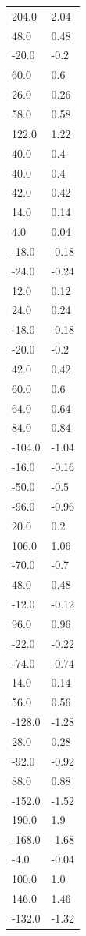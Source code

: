 \begin{longtable}{ll}
204.0 & 2.04 \\
48.0 & 0.48 \\
-20.0 & -0.2 \\
60.0 & 0.6 \\
26.0 & 0.26 \\
58.0 & 0.58 \\
122.0 & 1.22 \\
40.0 & 0.4 \\
40.0 & 0.4 \\
42.0 & 0.42 \\
14.0 & 0.14 \\
4.0 & 0.04 \\
-18.0 & -0.18 \\
-24.0 & -0.24 \\
12.0 & 0.12 \\
24.0 & 0.24 \\
-18.0 & -0.18 \\
-20.0 & -0.2 \\
42.0 & 0.42 \\
60.0 & 0.6 \\
64.0 & 0.64 \\
84.0 & 0.84 \\
-104.0 & -1.04 \\
-16.0 & -0.16 \\
-50.0 & -0.5 \\
-96.0 & -0.96 \\
20.0 & 0.2 \\
106.0 & 1.06 \\
-70.0 & -0.7 \\
48.0 & 0.48 \\
-12.0 & -0.12 \\
96.0 & 0.96 \\
-22.0 & -0.22 \\
-74.0 & -0.74 \\
14.0 & 0.14 \\
56.0 & 0.56 \\
-128.0 & -1.28 \\
28.0 & 0.28 \\
-92.0 & -0.92 \\
88.0 & 0.88 \\
-152.0 & -1.52 \\
190.0 & 1.9 \\
-168.0 & -1.68 \\
-4.0 & -0.04 \\
100.0 & 1.0 \\
146.0 & 1.46 \\
-132.0 & -1.32 \\

\end{longtable}
